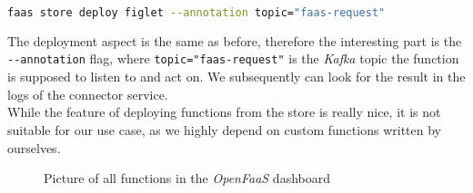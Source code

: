 \begin{lstlisting}[language=bash]
faas store deploy figlet --annotation topic="faas-request"
\end{lstlisting}

The deployment aspect is the same as before, therefore the interesting part is the \\
\texttt{-{}-annotation} flag, where \texttt{topic="faas-request"} is the \textit{Kafka} topic the
function is supposed to listen to and act on. We subsequently can look for the result in the logs of
the connector service. \\
While the feature of deploying functions from the store is really nice, it is not suitable for our
use case, as we highly depend on custom functions written by ourselves.

\begin{figure}[H]
  \centering
  \caption{Picture of all functions in the \textit{OpenFaaS} dashboard}
\end{figure}
